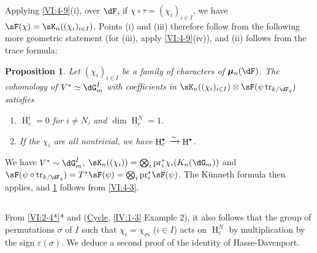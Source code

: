 \documentclass[oneside]{book}
\DeclareMathOperator{\h}{H}
\DeclareMathOperator{\tr}{tr}
\newcommand{\dmu}{{\bm\mu}}
\newcounter{char}
\newcommand{\iso}{\xrightarrow\sim}
\newcommand{\pr}{\mathrm{pr}} %
\theoremstyle{sga-source}
\theoremstyle{sga-source-dash}
\theoremstyle{sga-source-dotdash}
\theoremstyle{sga-source-number-note-dash}
\theoremstyle{sga-source-note-number-dotdash}
\theoremstyle{sga-source-example-dotdash}
\theoremstyle{sga-source-inline-number}
\theoremstyle{sga-source-bare-number}
\theoremstyle{sga-source}
\newtheorem{proposition_}[subsection]{Proposition}
\let\oldbullet\bullet
\renewcommand{\bullet}{\textnormal{\tiny$\oldbullet$}}
\newcommand{\PrintPage}[1]{}\newcommand{\MathPage}[1]{}\newcommand{\PrintCite}[2]{#1}\newcommand{\var}[3]{#2}
\begin{document}
Applying \ref{VI:4-9}(i), over $\dF$, if $\chi\circ \tau=(\chi_i)_{i\in I}$, 
we have $\sF(\chi) = \sK_n((\chi_i)_{i\in I})$. Points (i) and (iii) 
therefore follow from the following more geometric statement (for (iii), 
apply \ref{VI:4-9}(iv)), and (ii) follows from the trace formula: 





\begin{proposition_}\label{VI:4-11}
Let $(\chi_i)_{i\in I}$ be a family of characters of $\dmu_n(\dF)$. The 
cohomology of $V^\ast\simeq \dG_m^I$ with coefficients in 
$\sK_n((\chi_i)_{i\in I})\otimes \sF(\psi\tr_{k/\dF_q})$ satisfies 
\begin{enumerate}[\indent (i)]
  \item $\h_c^i{}=0$ for $i\ne N$, and $\dim \h_c^N{} = 1$. 
  \item If the $\chi_i$ are all nontrivial, we have 
    $\h_c^\bullet{}\iso \h^\bullet$. 
\end{enumerate}
\end{proposition_}

\PrintPage{202}
We have $V^\ast\sim \dG_m^I$, 
$\sK_n((\chi_i)) = \bigotimes_i \pr_i^\ast \chi_i(K_n(\dG_m))$ and 
$\sF(\psi\circ \var{\tr_{\dF_q/k}}{\tr_{k/\dF_q}}{S45-SOL-0828})=T^\ast \sF(\psi) = \bigotimes_i \pr_i^\ast \sF(\psi)$. 
The K\"unneth formula then applies, and \ref{VI:4-11} follows from 
\ref{VI:4-3}. 





\subsection{}\label{VI:4-12}

From \ref{VI:2-4*}* and (\hyperref[IV]{Cycle}, \ref{IV:1-3} Example 2), it also follows 
that the group of permutations $\sigma$ of $I$ such that 
$\chi_i = \chi_{\sigma i}$ ($i\in I$) acts on $\h_c^N$ by multiplication by 
the sign $\varepsilon(\sigma)$. We deduce a second proof 
of the identity of Hasse-Davenport. 
\end{document}
